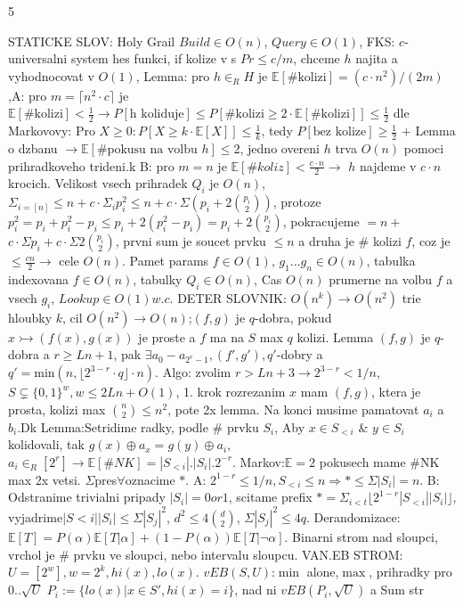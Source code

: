 \documentclass[8pt]{extarticle}
\begin{document}
\fontsize{4.8pt}{5.2pt}\selectfont 

\begin{multicols*}{5} 


STATICKE SLOV: Holy Grail $Build \in O(n)$, $Query \in O(1)$, FKS: $c$-universalni system hes funkci, if kolize v s $Pr\leq c/m$, chceme $h$ najita a vyhodnocovat v $O(1)$, Lemma: pro $h \in_R H$ je $\mathbb{E}[\#\text{kolizi}] = (c\cdot n^2)/(2m)$,A: pro $m=\lceil n^2 \cdot c\rceil$ je $\mathbb{E}[\#\text{kolizi}] < \frac{1}{2}\rightarrow P[\text{h koliduje}]\leq P[\#\text{kolizi} \geq 2\cdot\mathbb{E}[\#\text{kolizi}]]\leq\frac{1}{2}$ dle Markovovy: Pro $X\geq0: P[X\geq k\cdot\mathbb{E}[X]]\leq\frac{1}{k}$, tedy $P[\text{bez kolize}] \geq \frac{1}{2}$ + Lemma o dzbanu $\rightarrow \mathbb{E}[\# \text{pokusu na volbu } h] \leq 2$, jedno overeni $h$ trva $O(n)$ pomoci prihradkoveho trideni.k B: pro $m=n$ je $\mathbb{E}[\# koliz] < \frac{c\cdot n}{2}\rightarrow$ $h$ najdeme v $c\cdot n$ krocich. Velikost vsech prihradek $Q_i$ je $O(n)$, $\Sigma_{i=[n]}\leq n + c\cdot\Sigma_i p_i^2 \leq n + c\cdot\Sigma(p_i + 2\binom{p_i}{2})$, protoze $p_i^2 = p_i + p_i^2 - p_i \leq p_i + 2(p_i^2 - p_i) = p_i + 2\binom{p_i}{2}$, pokracujeme $= n + $ $c\cdot\Sigma p_i + c\cdot\Sigma2\binom{p_i}{2}$, prvni sum je soucet prvku $\leq n$ a druha je $\#$ kolizi $f$, coz je $\leq \frac{cn}{2} \rightarrow$ cele $O(n)$. Pamet params $f \in O(1)$, $g_1...g_n \in O(n)$, tabulka indexovana $f \in O(n)$, tabulky $Q_i \in O(n)$, Cas $O(n)$ prumerne na volbu $f$ a vsech $g_i$, $Lookup \in O(1) w.c.$ DETER SLOVNIK: $O(n^k)\rightarrow O(n^2)$ trie hloubky $k$, cil $O(n^2)\rightarrow O(n)$;$(f,g)$ je $q$-dobra, pokud $x \rightarrowtail (f(x),g(x))$ je proste a $f$ ma na $S$ max $q$ kolizi. Lemma $(f,g)$ je $q$-dobra a $r\geq Ln+1$, pak $\exists a_0-a_{2^r-1}, (f',g'), q'$-dobry a $q' = \text{min}(n, \lfloor 2^{3-r} \cdot q \rfloor \cdot n)$. Algo: zvolim $r > Ln +3 \rightarrow 2^{3-r}<1/n$, $S\subsetneq\{{0,1}\}^w, w\leq2Ln+O(1)$, 1. krok rozrezanim $x$ mam $(f,g)$, ktera je prosta, kolizi max $\binom{n}{2} \leq n^2$, pote 2x lemma. Na konci musime pamatovat $a_i$ a $b_i$.Dk Lemma:Setridime radky, podle \# prvku $S_i$, Aby $x \in S_{<i}$ \& $y \in S_i$ kolidovali, tak $g(x) \oplus a_x = g(y) \oplus a_i$, $a_i \in_R [2^r] \rightarrow \mathbb{E}[\#NK] = |S_{<i}|.|S_i|.2^{-r}$. Markov:$\mathbb{E}=2$ pokusech mame \#NK max 2x vetsi. $\Sigma$pres$\forall$oznacime $*$. A: $2^{1-r}\leq 1/n, S_{<i}\leq n \Rightarrow *\leq \Sigma |S_i| = n$. B: Odstranime trivialni pripady $|S_i|=0 or 1$, scitame prefix $* = \Sigma_{i<t}\lfloor 2^{1-r}|S_{<i}||S_i|\rfloor$, vyjadrime$|S{<i}||S_i|\leq \Sigma|S_j|^2$, $d^2 \leq 4\binom{d}{2}$, $\Sigma|S_j|^2 \leq 4q$. Derandomizace: $\mathbb{E}[T]=P(\alpha)\mathbb{E}[T|\alpha] + (1-P(\alpha))\mathbb{E}[T|\neg\alpha]$. Binarni strom nad sloupci, vrchol je \# prvku ve sloupci, nebo intervalu sloupcu. VAN.EB STROM:$U=[2^w],w=2^k,hi(x),lo(x)$. $vEB(S,U)$:$\min$ alone,$\max$, prihradky pro $0..\sqrt{U}$ $P_i:=\{lo(x)|x\in S', hi(x)=i\}$, nad ni $vEB(P_i, \sqrt{U})$ a Sum str 
\end{multicols*}
\end{document}
